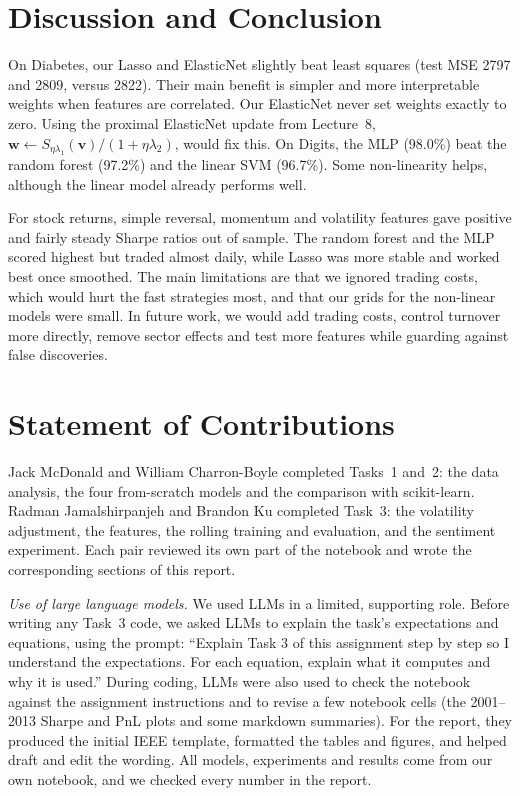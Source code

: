 \documentclass[conference]{IEEEtran}
\newcommand{\vect}[1]{\mathbf{#1}}
\begin{document}
\section{Discussion and Conclusion}
On Diabetes, our Lasso and ElasticNet slightly beat least squares (test MSE 2797 and 2809, versus 2822). Their main benefit is simpler and more interpretable weights when features are correlated. Our ElasticNet never set weights exactly to zero. Using the proximal ElasticNet update from Lecture~8, $\vect{w}\leftarrow S_{\eta\lambda_1}(\vect{v})/(1+\eta\lambda_2)$, would fix this. On Digits, the MLP (98.0\%) beat the random forest (97.2\%) and the linear SVM (96.7\%). Some non-linearity helps, although the linear model already performs well.

For stock returns, simple reversal, momentum and volatility features gave positive and fairly steady Sharpe ratios out of sample. The random forest and the MLP scored highest but traded almost daily, while Lasso was more stable and worked best once smoothed. The main limitations are that we ignored trading costs, which would hurt the fast strategies most, and that our grids for the non-linear models were small. In future work, we would add trading costs, control turnover more directly, remove sector effects and test more features while guarding against false discoveries.

\section{Statement of Contributions}
Jack McDonald and William Charron-Boyle completed Tasks~1 and~2: the data analysis, the four from-scratch models and the comparison with scikit-learn. Radman Jamalshirpanjeh and Brandon Ku completed Task~3: the volatility adjustment, the features, the rolling training and evaluation, and the sentiment experiment. Each pair reviewed its own part of the notebook and wrote the corresponding sections of this report.

\textit{Use of large language models.} We used LLMs in a limited, supporting role. Before writing any Task~3 code, we asked LLMs to explain the task's expectations and equations, using the prompt: ``Explain Task 3 of this assignment step by step so I understand the expectations. For each equation, explain what it computes and why it is used.'' During coding, LLMs were also used to check the notebook against the assignment instructions and to revise a few notebook cells (the 2001--2013 Sharpe and PnL plots and some markdown summaries). For the report, they produced the initial IEEE template, formatted the tables and figures, and helped draft and edit the wording. All models, experiments and results come from our own notebook, and we checked every number in the report.
\end{document}
